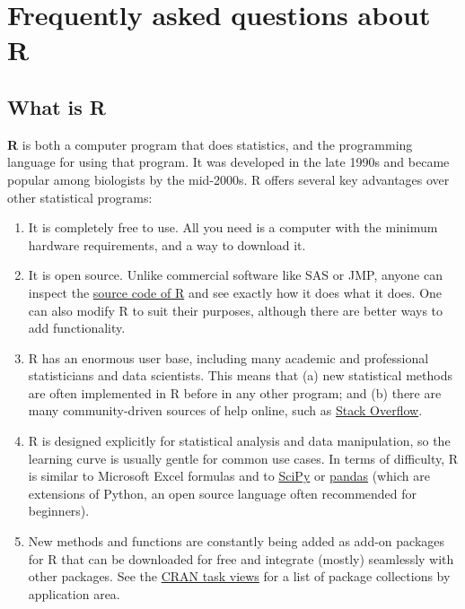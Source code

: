 \documentclass[
  13,
  letterpaper,
]{report}
\begin{document}
\section{Frequently asked questions about R}\label{sec-02-faq}

\subsection{What is R}\label{sec-02-faq-what}

\textbf{R} is both a computer program that does statistics, and the
programming language for using that program. It was developed in the
late 1990s and became popular among biologists by the mid-2000s. R
offers several key advantages over other statistical programs:

\begin{enumerate}
\def\labelenumi{\arabic{enumi}.}
\item
  It is completely free to use. All you need is a computer with the
  minimum hardware requirements, and a way to download it.
\item
  It is open source. Unlike commercial software like SAS or JMP, anyone
  can inspect the \href{https://github.com/wch/r-source}{source code of
  R} and see exactly how it does what it does. One can also modify R to
  suit their purposes, although there are better ways to add
  functionality.
\item
  R has an enormous user base, including many academic and professional
  statisticians and data scientists. This means that (a) new statistical
  methods are often implemented in R before in any other program; and
  (b) there are many community-driven sources of help online, such as
  \href{https://stackoverflow.com/questions/tagged/R}{Stack Overflow}.
\item
  R is designed explicitly for statistical analysis and data
  manipulation, so the learning curve is usually gentle for common use
  cases. In terms of difficulty, R is similar to Microsoft Excel
  formulas and to \href{https://scipy.org/}{SciPy} or
  \href{https://pandas.pydata.org/}{pandas} (which are extensions of
  Python, an open source language often recommended for beginners).
\item
  New methods and functions are constantly being added as add-on
  packages for R that can be downloaded for free and integrate (mostly)
  seamlessly with other packages. See the
  \href{https://cran.r-project.org/web/views/}{CRAN task views} for a
  list of package collections by application area.
\end{enumerate}
\end{document}
